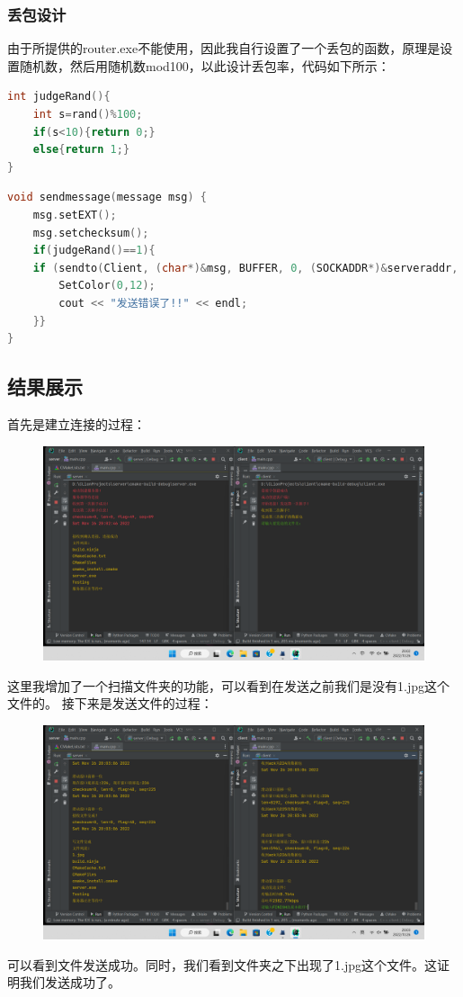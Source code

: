 \documentclass[UTF8,a4paper,10pt]{ctexart}
\begin{document}
\subsubsection{丢包设计}
由于所提供的router.exe不能使用，因此我自行设置了一个丢包的函数，原理是设置随机数，然后用随机数mod100，以此设计丢包率，代码如下所示：
\begin{lstlisting}[title=丢包函数,frame=trbl,language={C++}]
int judgeRand(){
    int s=rand()%100;
    if(s<10){return 0;}
    else{return 1;}
}
\end{lstlisting}
\begin{lstlisting}[title=发送函数,frame=trbl,language={C++}]
void sendmessage(message msg) {
    msg.setEXT();
    msg.setchecksum();
    if(judgeRand()==1){
    if (sendto(Client, (char*)&msg, BUFFER, 0, (SOCKADDR*)&serveraddr, sizeof(SOCKADDR)) == (SOCKET_ERROR)) {
        SetColor(0,12);
        cout << "发送错误了!!" << endl;
    }}
}
\end{lstlisting}
\subsection{结果展示}
首先是建立连接的过程：
\begin{figure}[H]
    \centering
    \includegraphics[scale=0.4]{G网1.png}
    \label{fig:6}
\end{figure}
这里我增加了一个扫描文件夹的功能，可以看到在发送之前我们是没有1.jpg这个文件的。
接下来是发送文件的过程：
\begin{figure}[H]
    \centering
    \includegraphics[scale=0.4]{G网2.png}
    \label{fig:7}
\end{figure}
可以看到文件发送成功。同时，我们看到文件夹之下出现了1.jpg这个文件。这证明我们发送成功了。
\end{document}
